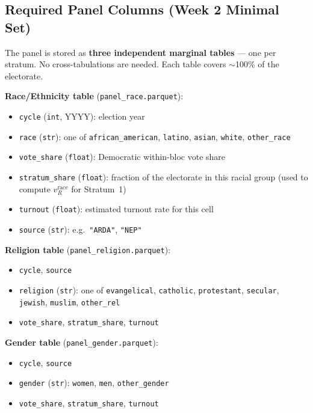\documentclass[11pt]{article}
\begin{document}
\subsection*{Required Panel Columns (Week 2 Minimal Set)}

The panel is stored as \textbf{three independent marginal tables} --- one per stratum.
No cross-tabulations are needed. Each table covers $\sim$100\% of the electorate.

\noindent\textbf{Race/Ethnicity table} (\texttt{panel\_race.parquet}):
\begin{itemize}[leftmargin=1.6em, itemsep=2pt]
  \item \texttt{cycle} (\texttt{int}, YYYY): election year
  \item \texttt{race} (\texttt{str}): one of \texttt{african\_american},
        \texttt{latino}, \texttt{asian}, \texttt{white}, \texttt{other\_race}
  \item \texttt{vote\_share} (\texttt{float}): Democratic within-bloc vote share
  \item \texttt{stratum\_share} (\texttt{float}): fraction of the electorate in
        this racial group (used to compute $v_R^{\text{race}}$ for Stratum~1)
  \item \texttt{turnout} (\texttt{float}): estimated turnout rate for this cell
  \item \texttt{source} (\texttt{str}): e.g.\ \texttt{"ARDA"}, \texttt{"NEP"}
\end{itemize}

\noindent\textbf{Religion table} (\texttt{panel\_religion.parquet}):
\begin{itemize}[leftmargin=1.6em, itemsep=2pt]
  \item \texttt{cycle}, \texttt{source}
  \item \texttt{religion} (\texttt{str}): one of \texttt{evangelical},
        \texttt{catholic}, \texttt{protestant}, \texttt{secular},
        \texttt{jewish}, \texttt{muslim}, \texttt{other\_rel}
  \item \texttt{vote\_share}, \texttt{stratum\_share}, \texttt{turnout}
\end{itemize}

\noindent\textbf{Gender table} (\texttt{panel\_gender.parquet}):
\begin{itemize}[leftmargin=1.6em, itemsep=2pt]
  \item \texttt{cycle}, \texttt{source}
  \item \texttt{gender} (\texttt{str}): \texttt{women}, \texttt{men},
        \texttt{other\_gender}
  \item \texttt{vote\_share}, \texttt{stratum\_share}, \texttt{turnout}
\end{itemize}
\end{document}
